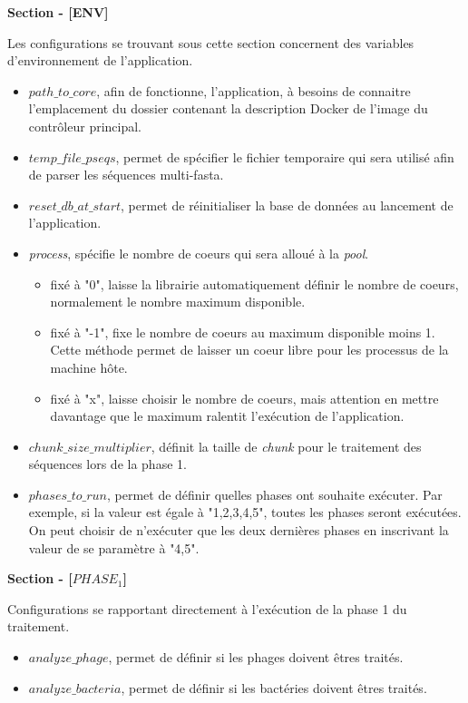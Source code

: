 \textbf{Section - [ENV]}

Les configurations se trouvant sous cette section concernent des variables d'environnement de l'application.

\begin{itemize}
\item \emph{$path\_to\_core$}, afin de fonctionne, l'application, à besoins de connaitre l'emplacement du dossier contenant la description Docker de l'image du contrôleur principal.
\item \emph{$temp\_file\_pseqs$}, permet de spécifier le fichier temporaire qui sera utilisé afin de parser les séquences multi-fasta. 
\item \emph{$reset\_db\_at\_start$}, permet de réinitialiser la base de données au lancement de l'application.
\item \emph{process}, spécifie le nombre de coeurs qui sera alloué à la \emph{pool}. 
\begin{itemize}
\item fixé à "0", laisse la librairie automatiquement définir le nombre de coeurs, normalement le nombre maximum disponible.
\item fixé à "-1", fixe le nombre de coeurs au maximum disponible moins 1. Cette méthode permet de laisser un coeur libre pour les processus de la machine hôte.
\item fixé à "x", laisse choisir le nombre de coeurs, mais attention en mettre davantage que le maximum ralentit l'exécution de l'application.
\end{itemize}
\item \emph{$chunk\_size\_multiplier$}, définit la taille de \emph{chunk} pour le traitement des séquences lors de la phase 1.
\item \emph{$phases\_to\_run$}, permet de définir quelles phases ont souhaite exécuter. Par exemple, si la valeur est égale à "1,2,3,4,5", toutes les phases seront exécutées. On peut choisir de n'exécuter que les deux dernières phases en inscrivant la valeur de se paramètre à "4,5".
\end{itemize}

\textbf{Section - [$PHASE_1$]}

Configurations se rapportant directement à l'exécution de la phase 1 du traitement.

\begin{itemize}
\item \emph{$analyze\_phage$}, permet de définir si les phages doivent êtres traités.
\item \emph{$analyze\_bacteria$}, permet de définir si les bactéries doivent êtres traités.
\end{itemize}


